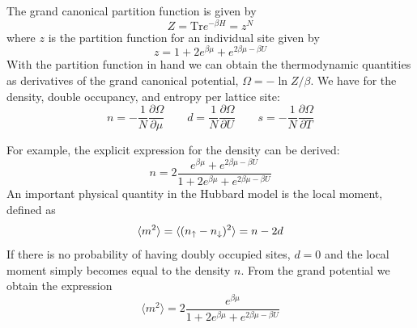 The grand canonical partition function is given by
\begin{equation} 
 Z = \text{Tr} e^{-\beta H}  =  z^{N} 
\end{equation} 
where $z$ is the partition function for an individual site given by
\begin{equation}
  z = 1 + 2e^{\beta\mu} + e^{2\beta\mu - \beta U} 
\end{equation}
With the partition function in hand we can obtain the thermodynamic quantities
as derivatives of the grand canonical potential, $\Omega = - \ln Z /
\beta $.  We have for the density, double occupancy, and entropy per lattice
site:
\begin{equation}
  n  = -\frac{1}{N}\frac{\partial \Omega}{ \partial \mu } ~~~~~~~~~
  d  = \frac{1}{N}\frac{\partial \Omega}{ \partial U }  ~~~~~~~~~
  s  = -\frac{1}{N}\frac{\partial \Omega}{ \partial T} 
\end{equation}

For example, the explicit expression for the density can be derived:
\begin{equation}
  n  = 2\frac{ e^{\beta \mu} + e^{2\beta\mu - \beta U} }
          { 1 + 2e^{\beta \mu} + e^{2\beta\mu-\beta U } } 
\end{equation}
An important physical quantity in the Hubbard model is the local moment,
defined as 
\begin{equation}
  \langle m ^{2} \rangle = \langle ( n_{ \uparrow } - n_{ \downarrow} )^{2} \rangle  = n - 2d 
\end{equation} 
If there is no probability of having doubly occupied sites, $d=0$ and the local
moment simply becomes equal to the density $n$.   From the grand potential we
obtain the expression
\begin{equation} 
  \langle m ^{2} \rangle =  2\frac{ e^{\beta \mu}  }
          { 1 + 2e^{\beta \mu} + e^{2\beta\mu-\beta U } } 
\end{equation}
 
